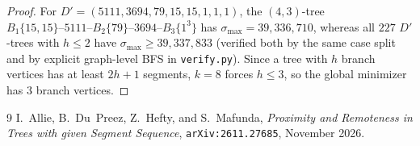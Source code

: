 \documentclass[11pt]{article}
\begin{document}
\begin{proof}
For $D' = (5111, 3694, 79, 15, 15, 1, 1, 1)$, the $(4,3)$-tree $B_1\{15,15\}\text{--}5111\text{--}B_2\{79\}\text{--}3694\text{--}B_3\{1^3\}$ has $\sigma_{\max} = 39{,}336{,}710$, whereas all $227$ $D'$-trees with $h \le 2$ have $\sigma_{\max} \ge 39{,}337{,}833$ (verified both by the same case split and by explicit graph-level BFS in \texttt{verify.py}). Since a tree with $h$ branch vertices has at least $2h+1$ segments, $k = 8$ forces $h \le 3$, so the global minimizer has $3$ branch vertices.
\end{proof}

\begin{thebibliography}{9}
I.~Allie, B.~Du~Preez, Z.~Hefty, and S.~Mafunda, \emph{Proximity and Remoteness in Trees with given Segment Sequence}, \texttt{arXiv:2611.27685}, November 2026.
\end{thebibliography}
\end{document}
